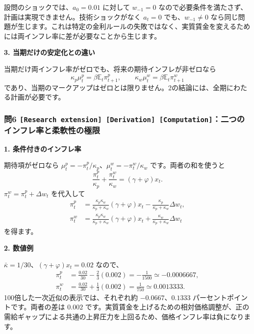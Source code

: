 \documentclass[
  japanese,
  lualatex,
  ja=standard,
  11pt,
  a4paper]{ltjsarticle}
\begin{document}
設問のショックでは、\(a_0=0.01\) に対して \(w_{-1}=0\)
なので必要条件を満たさず、計画は実現できません。技術ショックがなく
\(a_t=0\) でも、\(w_{-1}\ne0\)
なら同じ問題が生じます。これは特定の金利ルールの失敗ではなく、実質賃金を変えるためには両インフレ率に差が必要なことから生じます。

\textbf{3. 当期だけの安定化との違い}

当期だけ両インフレ率がゼロでも、将来の期待インフレが非ゼロなら \[
\kappa_p\mu_t^p=\beta\mathbb E_t\pi_{t+1}^p,
\qquad
\kappa_w\mu_t^w=\beta\mathbb E_t\pi_{t+1}^w
\]
であり、当期のマークアップはゼロとは限りません。2の結論には、全期にわたる計画が必要です。


\subsubsection{\texorpdfstring{問6
\texttt{{[}Research\ extension{]}\ {[}Derivation{]}\ {[}Computation{]}}：二つのインフレ率と柔軟性の極限}{問6 {[}Research extension{]} {[}Derivation{]} {[}Computation{]}：二つのインフレ率と柔軟性の極限}}\label{ux554f6-research-extension-derivation-computationux4e8cux3064ux306eux30a4ux30f3ux30d5ux30ecux7387ux3068ux67d4ux8edfux6027ux306eux6975ux9650}

\textbf{1. 条件付きのインフレ率}

期待項がゼロなら
\(\mu_t^p=-\pi_t^p/\kappa_p\)、\(\mu_t^w=-\pi_t^w/\kappa_w\)
です。両者の和を使うと \[
\frac{\pi_t^p}{\kappa_p}+\frac{\pi_t^w}{\kappa_w}
=(\gamma+\varphi)x_t.
\] \(\pi_t^w=\pi_t^p+\Delta w_t\) を代入して \[
\begin{aligned}
\pi_t^p&=\frac{\kappa_p\kappa_w}{\kappa_p+\kappa_w}
(\gamma+\varphi)x_t-\frac{\kappa_p}{\kappa_p+\kappa_w}\Delta w_t,\\
\pi_t^w&=\frac{\kappa_p\kappa_w}{\kappa_p+\kappa_w}
(\gamma+\varphi)x_t+\frac{\kappa_w}{\kappa_p+\kappa_w}\Delta w_t
\end{aligned}
\] を得ます。

\textbf{2. 数値例}

\(\bar\kappa=1/30\)、\((\gamma+\varphi)x_t=0.02\) なので、 \[
\begin{aligned}
\pi_t^p&=\frac{0.02}{30}-\frac23(0.002)
=-\frac1{1500}\simeq-0.0006667,\\
\pi_t^w&=\frac{0.02}{30}+\frac13(0.002)
=\frac1{750}\simeq0.0013333.
\end{aligned}
\] 100倍した一次近似の表示では、それぞれ約 \(-0.0667\)、\(0.1333\)
パーセントポイントです。両者の差は \(0.002\)
です。実質賃金を上げるための相対価格調整が、正の需給ギャップによる共通の上昇圧力を上回るため、価格インフレ率は負になります。
\end{document}
